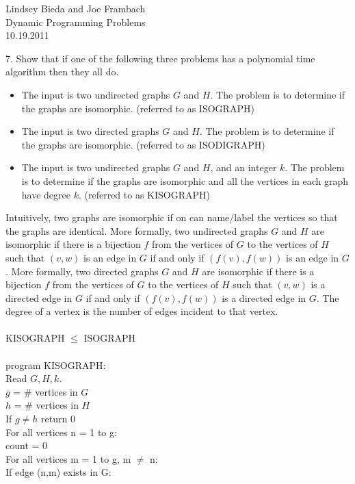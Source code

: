 \documentclass[10pt]{article}
\newcommand{\tab}{\hspace*{2em}}
\newcommand{\tabb}{\hspace*{4em}}
\newcommand{\tabbb}{\hspace*{6em}}
\begin{document}
	\begin{flushright}
	Lindsey Bieda and Joe Frambach\\
	Dynamic Programming Problems\\
	10.19.2011
	\end{flushright}
		7. Show that if one of the following three problems has a polynomial time algorithm then they all do.
		\begin{itemize}
		\item The input is two undirected graphs $G$ and $H$. The problem is to determine if the graphs are
		isomorphic. (referred to as ISOGRAPH)
		\item The input is two directed graphs $G$ and $H$. The problem is to determine if the graphs are
		isomorphic. (referred to as ISODIGRAPH)
		\item The input is two undirected graphs $G$ and $H$, and an integer $k$. The problem is to determine if
			  the graphs are isomorphic and all the vertices in each graph have degree $k$. (referred to as KISOGRAPH)
		\end{itemize}
		Intuitively, two graphs are isomorphic if on can name/label the vertices so that the graphs are identical.
		More formally, two undirected graphs $G$ and $H$ are isomorphic if there is a bijection $f$ from the vertices
		of $G$ to the vertices of $H$ such that $(v, w)$ is an edge in $G$ if and only if $(f (v), f (w))$ is an edge in $G$.
		More formally, two directed graphs $G$ and $H$ are isomorphic if there is a bijection $f$ from the vertices
		of $G$ to the vertices of $H$ such that $(v, w)$ is a directed edge in $G$ if and only if $(f (v), f (w))$ is a directed
		edge in $G$. The degree of a vertex is the number of edges incident to that vertex.
		\\
		\\
		KISOGRAPH $\leq$ ISOGRAPH\\
		\\
		program KISOGRAPH:\\
		\tab Read $G,H,k$.\\
		\tab $g$ = \# vertices in $G$\\
		\tab $h$ = \# vertices in $H$\\
		\tab If $g \neq h$ return 0\\
		\tab For all vertices n = 1 to g:\\
		\tabb count = 0\\
		\tabb For all vertices m = 1 to g, m $\neq$ n:\\
		\tabbb If edge (n,m) exists in G:\\
\end{document}
